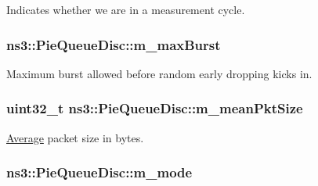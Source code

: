 Indicates whether we are in a measurement cycle. 

\subsubsection[{\texorpdfstring{m\+\_\+max\+Burst}{m_maxBurst}}]{ ns3\+::\+Pie\+Queue\+Disc\+::m\+\_\+max\+Burst\hspace{0.3cm}{\ttfamily [private]}}\hypertarget{classns3_1_1PieQueueDisc_a3eed3c319ffb19556aedd333da047954}{}\label{classns3_1_1PieQueueDisc_a3eed3c319ffb19556aedd333da047954}


Maximum burst allowed before random early dropping kicks in. 

\subsubsection[{\texorpdfstring{m\+\_\+mean\+Pkt\+Size}{m_meanPktSize}}]{\setlength{\rightskip}{0pt plus 5cm}uint32\+\_\+t ns3\+::\+Pie\+Queue\+Disc\+::m\+\_\+mean\+Pkt\+Size\hspace{0.3cm}{\ttfamily [private]}}\hypertarget{classns3_1_1PieQueueDisc_a02068aca097b0bd7aba59f734ed5571e}{}\label{classns3_1_1PieQueueDisc_a02068aca097b0bd7aba59f734ed5571e}


\hyperlink{classns3_1_1Average}{Average} packet size in bytes. 

\subsubsection[{\texorpdfstring{m\+\_\+mode}{m_mode}}]{ ns3\+::\+Pie\+Queue\+Disc\+::m\+\_\+mode\hspace{0.3cm}{\ttfamily [private]}}\hypertarget{classns3_1_1PieQueueDisc_ad3e0fb992a133e8dcd1e0937a156ff2b}{}\label{classns3_1_1PieQueueDisc_ad3e0fb992a133e8dcd1e0937a156ff2b}


